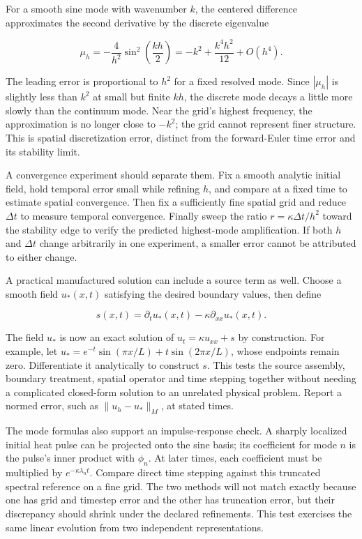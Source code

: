 \hypertarget{04-visual-computing-ii-ch030-spatial-and-temporal-error-have-different-signatures}{}

For a smooth sine mode with wavenumber \(k\), the centered difference approximates the second derivative by the discrete eigenvalue

\[
\mu_h=-\frac{4}{h^2}\sin^2\left(\frac{kh}{2}\right)
=-k^2+\frac{k^4h^2}{12}+O(h^4).
\]

The leading error is proportional to \(h^2\) for a fixed resolved mode. Since \(|\mu_h|\) is slightly less than \(k^2\) at small but finite \(kh\), the discrete mode decays a little more slowly than the continuum mode. Near the grid's highest frequency, the approximation is no longer close to \(-k^2\); the grid cannot represent finer structure. This is spatial discretization error, distinct from the forward-Euler time error and its stability limit.

A convergence experiment should separate them. Fix a smooth analytic initial field, hold temporal error small while refining \(h\), and compare at a fixed time to estimate spatial convergence. Then fix a sufficiently fine spatial grid and reduce \(\Delta t\) to measure temporal convergence. Finally sweep the ratio \(r=\kappa\Delta t/h^2\) toward the stability edge to verify the predicted highest-mode amplification. If both \(h\) and \(\Delta t\) change arbitrarily in one experiment, a smaller error cannot be attributed to either change.

A practical manufactured solution can include a source term as well. Choose a smooth field \(u_*(x,t)\) satisfying the desired boundary values, then define

\[
s(x,t)=\partial_tu_*(x,t)-\kappa\partial_{xx}u_*(x,t).
\]

The field \(u_*\) is now an exact solution of \(u_t=\kappa u_{xx}+s\) by construction. For example, let \(u_*=e^{-t}\sin(\pi x/L)+t\sin(2\pi x/L)\), whose endpoints remain zero. Differentiate it analytically to construct \(s\). This tests the source assembly, boundary treatment, spatial operator and time stepping together without needing a complicated closed-form solution to an unrelated physical problem. Report a normed error, such as \(\|u_h-u_*\|_M\), at stated times.

The mode formulas also support an impulse-response check. A sharply localized initial heat pulse can be projected onto the sine basis; its coefficient for mode \(n\) is the pulse's inner product with \(\phi_n\). At later times, each coefficient must be multiplied by \(e^{-\kappa\lambda_nt}\). Compare direct time stepping against this truncated spectral reference on a fine grid. The two methods will not match exactly because one has grid and timestep error and the other has truncation error, but their discrepancy should shrink under the declared refinements. This test exercises the same linear evolution from two independent representations.

